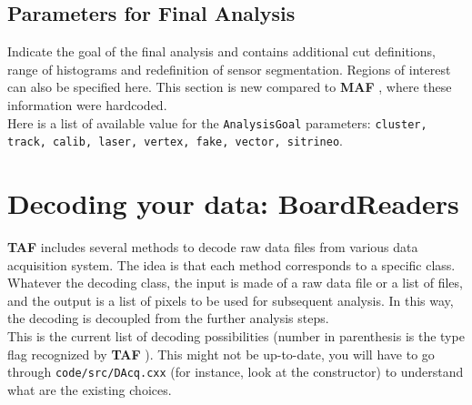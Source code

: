 \documentclass[a4paper, 12pt, twoside]{article}
\newcommand{\TAF}{{\bf TAF }}
\newcommand{\MAF}{{\bf MAF }}
\begin{document}
\subsection{Parameters for Final Analysis}
\label{subsec:paramFinalAnalysis}
Indicate the goal of the final analysis and contains additional cut definitions, range of histograms and redefinition of sensor segmentation. Regions of interest can also be specified here. This section is new compared to \MAF, where these information were hardcoded.\\
Here is a list of available value for the {\tt AnalysisGoal} parameters: {\tt cluster, track, calib, laser, vertex, fake, vector, sitrineo}.



\vspace{2cm}

\section{Decoding your data: BoardReaders}
\label{secReader}

\TAF  includes several methods to decode raw data files from various data acquisition system. The idea is that each method corresponds to a specific class. Whatever the decoding class, the input is made of a raw data file or a list of files, and the output is a list of pixels to be used for subsequent analysis. In this way, the decoding is decoupled from the further analysis steps.\\

This is the current list of decoding possibilities (number in parenthesis is the type flag recognized by \TAF). This might not be up-to-date, you will have to go through {\tt code/src/DAcq.cxx} (for instance, look at the constructor) to understand what are the existing choices.
\end{document}
